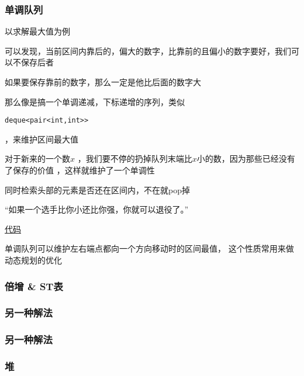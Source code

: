 \documentclass{beamer}
\begin{document}
  \begin{frame}[fragile]
    \frametitle{单调队列}
    以求解最大值为例

    可以发现，当前区间内靠后的，偏大的数字，比靠前的且偏小的数字要好，我们可以不保存后者

    \pause

    \vspace*{1\baselineskip}

    如果要保存靠前的数字，那么一定是他比后面的数字大

    \pause

    那么像是搞一个单调递减，下标递增的序列，类似
    \begin{lstlisting}
deque<pair<int,int>>
    \end{lstlisting}
    ，来维护区间最大值

    \pause

    对于新来的一个数$x$
    ，我们要不停的扔掉队列末端比$x$小的数，因为那些已经没有了保存的价值
    ，这样就维护了一个单调性

    \vspace*{1\baselineskip}

    同时检索头部的元素是否还在区间内，不在就pop掉
  \end{frame}

  \begin{frame}
    “如果一个选手比你小还比你强，你就可以退役了。”
    
    \vspace*{1\baselineskip}
    
    \href{http://syh521.cn/file/monotone-queue.cpp}{代码}
    
    \vspace*{1\baselineskip}

    单调队列可以维护左右端点都向一个方向移动时的区间最值，
    这个性质常用来做动态规划的优化
  \end{frame}

  \begin{frame}
    \frametitle{倍增 \& ST表}
  \end{frame}


  \begin{frame}
    \frametitle{另一种解法}
  \end{frame}

  \begin{frame}
    \frametitle{另一种解法}
  \end{frame}

  \begin{frame}
    \frametitle{堆}
    
  \end{frame}
\end{document}
